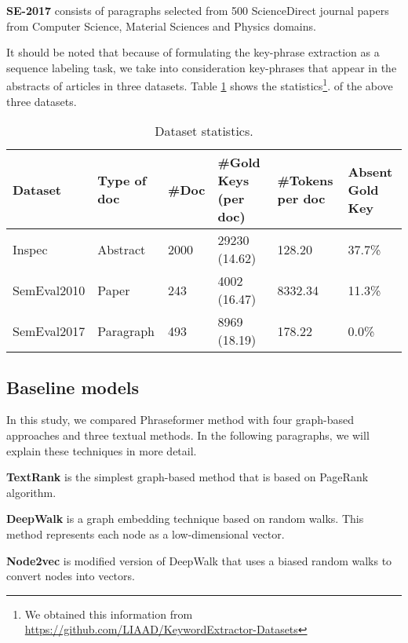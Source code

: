 \documentclass[review,3p]{elsarticle}
\begin{document}
\textbf{SE-2017} consists of paragraphs selected from 500 ScienceDirect journal papers from Computer Science, Material Sciences and Physics domains.

It should be noted that because of formulating the key-phrase extraction as a sequence labeling task, we take into consideration key-phrases that appear in the abstracts of articles in three datasets. Table \ref{dataset_detail}  shows  the  statistics\footnote{We obtained this information from \url{https://github.com/LIAAD/KeywordExtractor-Datasets}}.  of  the  above three  datasets.  


\begin{table}[ht]
\caption{Dataset statistics.}
\label{dataset_detail}
\begin{tabular}{l|l|l|l|l|l}
\hline
\textbf{Dataset} & \textbf{Type of doc} & \textbf{\#Doc} & \textbf{\#Gold Keys (per doc)} & \textbf{\#Tokens per doc} & \textbf{Absent Gold Key} \\\hline
Inspec           & Abstract             & 2000           & 29230 (14.62)                  & 128.20                    & 37.7\%         \\
SemEval2010      & Paper                & 243            & 4002 (16.47)                   & 8332.34                   & 11.3\%         \\
SemEval2017      & Paragraph            & 493            & 8969 (18.19)                   & 178.22                   & 0.0\%      
\\ \hline
\end{tabular}
\end{table}

\subsection{Baseline models}
In this study, we compared Phraseformer method with four graph-based approaches and three textual methods. In the following paragraphs, we will explain these techniques in more detail.

\textbf{TextRank} \cite{mihalcea2004textrank} is the simplest graph-based method that is based on PageRank algorithm.

\textbf{DeepWalk} \cite{Perozzi2014} is a graph embedding technique based on random walks. This method represents each node as a low-dimensional vector.

\textbf{Node2vec} \cite{Grover2016} is modified version of DeepWalk that uses a biased random walks to convert nodes into vectors.
\end{document}
